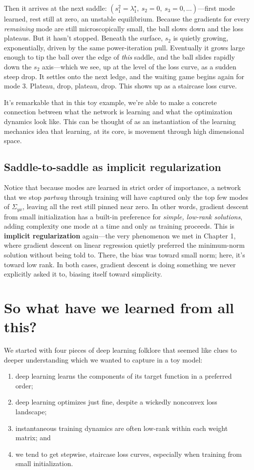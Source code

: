 Then it arrives at the next saddle: $(s_1^2 = \lambda^\star_1,\ s_2 = 0,\ s_3 = 0,
\dots)$---first mode learned, rest still at zero, an unstable equilibrium. Because the gradients for every \emph{remaining}
mode are still microscopically small, the ball slows down and the loss plateaus. But it hasn't stopped. Beneath the surface, $s_2$ is quietly growing,
exponentially, driven by the same power-iteration pull. Eventually it grows large
enough to tip the ball over the edge of \emph{this} saddle, and the ball slides
rapidly down the $s_2$ axis---which we see, up at the level of the loss curve, as a
sudden steep drop. It settles onto the next ledge, and the waiting game begins
again for mode 3. Plateau, drop, plateau, drop. This shows up as a staircase loss curve.

It's remarkable that in this toy example, we're able to make a concrete 
connection between what the network is learning and what the optimization dynamics look like.
This can be thought of as an instantiation of the learning mechanics idea that learning, at its core,
is movement through high dimensional space.

\subsection{Saddle-to-saddle as implicit regularization}

Notice that because modes are learned in strict order of importance, a
network that we stop \emph{partway} through training will have captured only the
top few modes of $\Sigma_{yx}$, leaving all the rest still pinned near zero. In
other words, gradient descent from small initialization has a built-in preference
for \emph{simple, low-rank solutions}, adding complexity one mode at a time and
only as training proceeds. This is \textbf{implicit regularization} again---the
very phenomenon we met in Chapter 1, where gradient descent on linear regression
quietly preferred the minimum-norm solution without being told to. There, the bias
was toward small norm; here, it's toward low rank. In both cases, gradient descent
is doing something we never explicitly asked it to, biasing itself toward
simplicity.

\section{So what have we learned from all this?}

We started with four pieces of deep learning folklore that seemed like clues to deeper understanding which we wanted to capture in a toy model:
\begin{enumerate}
    \item deep learning learns the components of its target function in a
    preferred order;
    \item deep learning optimizes just fine, despite a wickedly nonconvex loss
    landscape;
    \item instantaneous training dynamics are often low-rank within each weight
    matrix; and
    \item we tend to get stepwise, staircase loss curves, especially when training
    from small initialization.
\end{enumerate}


